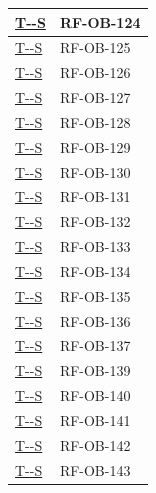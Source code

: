 \documentclass[a4paper,12pt]{article}
\newcounter{testsys}
\newcommand{\systestref}{%
  \hyperlink{T-\arabic{testsys}-S}{T-\arabic{testsys}-S}%
}
\begin{document}
\begin{longtable}{|>{\centering\arraybackslash}p{5cm}|>{\centering\arraybackslash}p{9cm}|}
\stepcounter{testsys}
\systestref & RF-OB-124 \\
\hline

\stepcounter{testsys}
\systestref & RF-OB-125 \\
\hline

\stepcounter{testsys}
\systestref & RF-OB-126 \\
\hline

\stepcounter{testsys}
\systestref & RF-OB-127 \\
\hline

\stepcounter{testsys}
\systestref & RF-OB-128 \\
\hline

\stepcounter{testsys}
\systestref & RF-OB-129 \\
\hline

\stepcounter{testsys}
\systestref & RF-OB-130 \\
\hline

\stepcounter{testsys}
\systestref & RF-OB-131 \\
\hline

\stepcounter{testsys}
\systestref & RF-OB-132 \\
\hline

\stepcounter{testsys}
\systestref & RF-OB-133 \\
\hline

\stepcounter{testsys}
\systestref & RF-OB-134 \\
\hline

\stepcounter{testsys}
\systestref & RF-OB-135 \\
\hline

\stepcounter{testsys}
\systestref & RF-OB-136 \\
\hline

\stepcounter{testsys}
\systestref & RF-OB-137 \\
\hline

\stepcounter{testsys}
\systestref & RF-OB-139 \\
\hline

\stepcounter{testsys}
\systestref & RF-OB-140 \\
\hline

\stepcounter{testsys}
\systestref & RF-OB-141 \\
\hline

\stepcounter{testsys}
\systestref & RF-OB-142 \\
\hline

\stepcounter{testsys}
\systestref & RF-OB-143 \\
\hline


\end{longtable}
\end{document}
